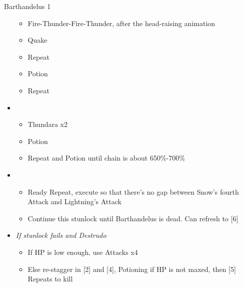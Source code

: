 \begin{paracol}{2}
\begin{battle}{Barthandelus 1}
\begin{itemize}
			      \begin{itemize}
				      \item Fire-Thunder-Fire-Thunder, after the head-raising animation
				      \item Quake
				      \item Repeat
				      \item Potion
				      \item Repeat
			      \end{itemize}
			\item \fourth
			      \begin{itemize}
				      \item Thundara x2
				      \item Potion
				      \item Repeat and Potion until chain is about 650\%-700\%
			      \end{itemize}
			\item \fifth
			      \begin{itemize}
				      \item Ready Repeat, execute so that there's no gap between Snow's fourth Attack and Lightning's Attack
				      \item Continue this stunlock until Barthandelus is dead. Can refresh to [6]
			      \end{itemize}
			\item \textit{If stunlock fails and Destrudo}
			      \begin{itemize}
				      \item If HP is low enough, use Attacks x4
				      \item Else re-stagger in [2] and [4], Potioning if HP is not maxed, then [5] Repeats to kill
			      \end{itemize}
		\end{itemize}
	\end{battle}
\end{paracol}
